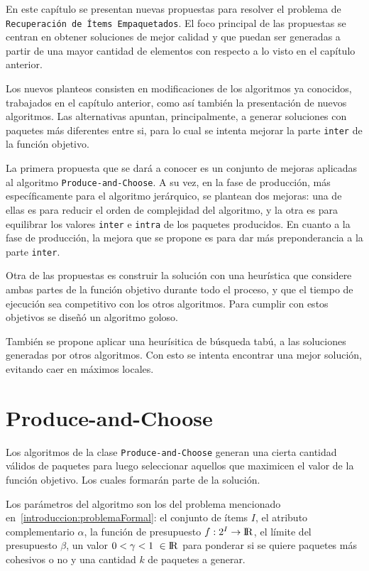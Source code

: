 En este capítulo se presentan nuevas propuestas para resolver el problema de \texttt{\\Recuperación de Ítems Empaquetados}. El foco principal de las propuestas se centran en obtener soluciones de mejor calidad y que puedan ser generadas a partir de una mayor cantidad de elementos con respecto a lo visto en el capítulo anterior. 

Los nuevos planteos consisten en modificaciones de los algoritmos ya conocidos, trabajados en el capítulo anterior, como así también la presentación de nuevos algoritmos. Las alternativas apuntan, principalmente, a generar soluciones con paquetes más diferentes entre si, para lo cual se intenta mejorar la parte \texttt{inter} de la función objetivo.

La primera propuesta que se dará a conocer es un conjunto de mejoras aplicadas al algoritmo \texttt{Produce\allowbreak-and\allowbreak-Choose}. A su vez, en la fase de producción, más específicamente para el algoritmo jerárquico, se plantean dos mejoras: una de ellas es para reducir el orden de complejidad del algoritmo, y la otra es para equilibrar los valores \texttt{inter} e \texttt{intra} de los paquetes producidos. En cuanto a la fase de producción, la mejora que se propone es para dar más preponderancia a la parte \texttt{inter}.

Otra de las propuestas es construir la solución con una heurística que considere ambas partes de la función objetivo durante todo el proceso, y que el tiempo de ejecución sea competitivo con los otros algoritmos. Para cumplir con estos objetivos se diseñó un algoritmo goloso.

También se propone aplicar una heurísitica de búsqueda tabú, a las soluciones generadas por otros algoritmos. Con esto se intenta encontrar una mejor solución, evitando caer en máximos locales. 

\section{Produce-and-Choose}
Los algoritmos de la clase \texttt{Produce\allowbreak-and\allowbreak-Choose} generan una cierta cantidad válidos de paquetes para luego seleccionar aquellos que maximicen el valor de la función objetivo. Los cuales formarán parte de la solución.

Los parámetros del algoritmo son los del problema mencionado en~\autoref{introduccion:problemaFormal}: el conjunto de ítems $I$, el atributo complementario $\alpha$, la función de presupuesto $f: 2^{I} \rightarrow \rm I \!R$, el límite del presupuesto $\beta$, un valor $0 < \gamma < 1\ \in \rm I \!R$ para ponderar si se quiere paquetes más cohesivos o no y una cantidad $k$ de paquetes a generar. 

